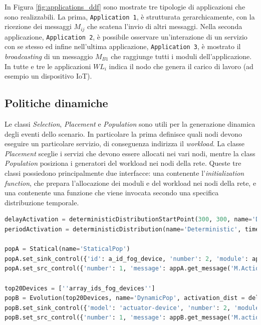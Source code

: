 In Figura \ref{fig:applications_ddf} sono mostrate tre tipologie di applicazioni che sono realizzabili. La prima, \texttt{Application 1}, è strutturata gerarchicamente, con la ricezione dei messaggi $M_{ij}$ che scatena l'invio di altri messaggi. Nella seconda applicazione, \texttt{Application 2}, è possibile osservare un'interazione di un servizio con se stesso ed infine nell'ultima applicazione, \texttt{Application 3}, è mostrato il \textit{broadcasting} di un messaggio $M_{B1}$ che raggiunge tutti i moduli dell'applicazione. In tutte e tre le applicazioni $WL_i$ indica il nodo che genera il carico di lavoro (ad esempio un dispositivo IoT).

\subsection{Politiche dinamiche}
Le classi \textit{Selection}, \textit{Placement} e \textit{Population} sono utili per la generazione dinamica degli eventi dello scenario. In particolare la prima definisce quali nodi devono eseguire un particolare servizio, di conseguenza indirizza il \textit{workload}. La classe \textit{Placement} sceglie i servizi che devono essere allocati nei vari nodi, mentre la class \textit{Population} posiziona i generatori del workload nei nodi della rete. Queste tre classi possiedono principalmente due interfacce: una contenente l'\textit{initialization function}, che prepara l'allocazione dei moduli e del workload nei nodi della rete, e una contenente una funzione che viene invocata secondo una specifica distribuzione temporale.

\begin{lstlisting}[language=python, caption={Definizione di due Population policies: una statica (\texttt{popA}) ed una dinamica (\texttt{popB}) \cite{YAFSSimulator}}, captionpos=b, label={lst:population-policy}]
delayActivation = deterministicDistributionStartPoint(300, 300, name='Deterministic')
periodActivation = deterministicDistribution(name='Deterministic', time=100)

popA = Statical(name='StaticalPop')
popA.set_sink_control({'id': a_id_fog_device, 'number': 2, 'module': appA.get_sink_modules()})
popA.set_src_control({'number': 1, 'message': appA.get_message('M.Action'), 'distribution': periodicActivation})

top20Devices = [''array_ids_fog_devices'']
popB = Evolution(top20Devices, name='DynamicPop', activation_dist = delayActivation)
popB.set_sink_control({'model': 'actuator-device', 'number': 2, 'module': appB.get_sink_control()})
popB.set_src_control({'number': 1, 'message': appB.get_message('M.action'), 'distribution': periodicActivation})

\end{lstlisting}

